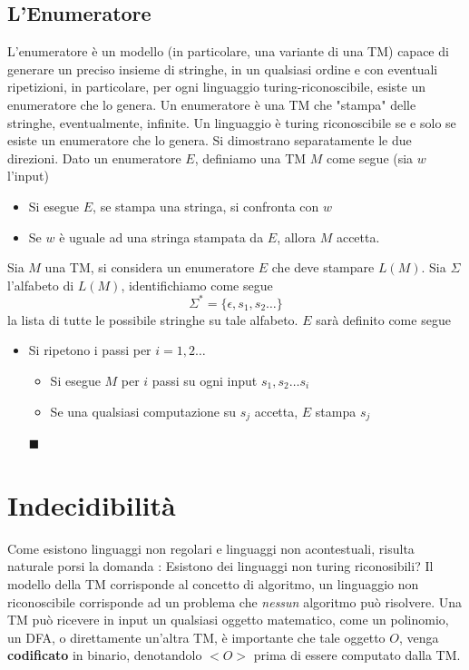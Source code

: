 \documentclass[10pt, letterpaper]{report}
\begin{document}
 \subsection{L'Enumeratore}
 L'enumeratore è un modello (in particolare, una variante di una TM) capace di generare un preciso insieme di stringhe, in un qualsiasi ordine e con eventuali ripetizioni, in particolare, per ogni linguaggio turing-riconoscibile, esiste un enumeratore che lo genera.\acc
Un enumeratore è una TM che "stampa" delle stringhe, eventualmente, infinite.\acc 
\teo{} Un linguaggio è turing riconoscibile se e solo se esiste un enumeratore che lo genera.\acc 
\dimo{} Si dimostrano separatamente le due direzioni.\acc 
\boxedMath{$\impliedby$} Dato un enumeratore $E$, definiamo una TM $M$ come segue (sia $w$ l'input)\begin{itemize}
    \item Si esegue $E$, se stampa una stringa, si confronta con $w$
    \item Se $w$ è uguale ad una stringa stampata da $E$, allora $M$ accetta.
\end{itemize}
\boxedMath{$\implies$} Sia $M$ una TM, si considera un enumeratore $E$ che deve 
stampare $L(M)$. Sia $\Sigma$ l'alfabeto di 
$L(M)$, identifichiamo come segue 
$$ \Sigma^*=\{\epsilon,s_1,s_2\dots\}$$
la lista di tutte le possibile stringhe su tale alfabeto. $E$ sarà definito come segue 
\begin{itemize}
    \item Si ripetono i passi per $i=1,2\dots$\begin{itemize}
        \item Si esegue $M$ per $i$ passi su ogni input $s_1,s_2\dots s_i$
        \item Se una qualsiasi computazione su $s_j$ accetta, $E$ stampa 
        $s_j$
    \end{itemize}
\hfill$\blacksquare$\end{itemize}\flowerLine 
\section{Indecidibilità}
Come esistono linguaggi non regolari e linguaggi non acontestuali, risulta naturale porsi la domanda : Esistono dei linguaggi non turing riconosibili? Il modello della TM corrisponde al concetto di algoritmo, un linguaggio non riconoscibile corrisponde ad un problema che \textit{nessun} algoritmo può risolvere.\acc 
Una TM può ricevere in input un qualsiasi oggetto matematico, come un polinomio, un DFA, o direttamente un'altra TM, è importante che tale oggetto $O$, venga \textbf{codificato} in binario, denotandolo $<O>$ prima di essere computato dalla TM.
 
\end{document}
